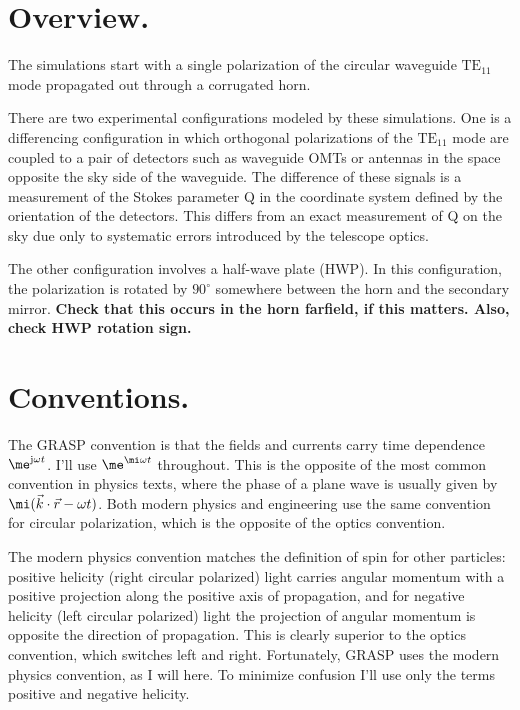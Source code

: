 \documentclass[10pt,english]{article}
\begin{document}
\section*{Overview.}

The simulations start with a single polarization of the circular waveguide $\text{TE}_{11}$ mode propagated out through a corrugated horn.

There are two experimental configurations modeled by these simulations. One is a differencing configuration in which orthogonal polarizations of the $\text{TE}_{11}$ mode are coupled to a pair of detectors such as waveguide OMTs or antennas in the space opposite the sky side of the waveguide. The difference of these signals is a measurement of the Stokes parameter Q in the coordinate system defined by the orientation of the detectors. This differs from an exact measurement of Q on the sky due only to systematic errors introduced by the telescope optics.

The other configuration involves a half-wave plate (HWP). In this configuration, the polarization is rotated by $90^{\circ}$ somewhere between the horn and the secondary mirror. \textbf{Check that this occurs in the horn farfield, if this matters. Also, check HWP rotation sign.}

\section*{Conventions.}

The GRASP convention is that the fields and currents carry time dependence $\me^{\mathrm{j} \omega t}$. I'll use $\me^{\mi \omega t}$ throughout. This is the opposite of the most common convention in physics texts, where the phase of a plane wave is usually given by $\mi (\vec{k} \cdot \vec{r} - \omega t)$. Both modern physics and engineering use the same convention for circular polarization, which is the opposite of the optics convention. 

The modern physics convention matches the definition of spin for other particles: positive helicity (right circular polarized) light carries angular momentum with a positive projection along the positive axis of propagation, and for negative helicity (left circular polarized) light the projection of angular momentum is opposite the direction of propagation. This is clearly superior to the optics convention, which switches left and right. Fortunately, GRASP uses the modern physics convention, as I will here. To minimize confusion I'll use only the terms positive and negative helicity.
\end{document}
